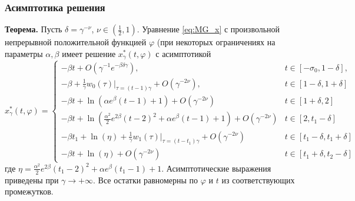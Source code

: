 \begin{frame}
	\frametitle{Асимптотика решения}
	
	\textbf{Теорема.} Пусть $\delta = \gamma^{-\nu}$, $\nu \in (\frac{1}{2}, 1)$. Уравнение \eqref{eq:MG_x} с произвольной непрерывной положительной функцией $\varphi$ (при некоторых ограничениях на параметры $\alpha, \beta$ имеет решение $x_\gamma^*(t, \varphi)$ с асимптотикой
	\footnotesize
	\begin{equation*}
		\label{eq:sol_x*gamma}
		x^*_\gamma(t, \varphi)= 
		\begin{cases}
			- \beta t + O(\gamma^{-1} e^{-\beta \delta \gamma}), & t\in[-\sigma_0, 1 - \delta],\\
			-\beta + \frac{1}{\gamma} w_0(\tau)|_{\tau=(t - 1)\gamma} + O(\gamma^{-2\nu}), & t \in [1 - \delta,1 + \delta]\\
			- \beta t + \ln(\alpha e^{\beta}(t - 1) + 1) + O(\gamma^{-2\nu}) & t\in[1 + \delta, 2]\\
			- \beta t + \ln(\frac{\alpha^2}{2}e^{2 \beta}(t - 2)^2 + \alpha e^{\beta}(t - 1) + 1) + O(\gamma^{-2\nu}) & t \in [2, t_1 - \delta]\\
			- \beta t_1 + \ln(\eta)+\frac{1}{\gamma} w_1(\tau)|_{\tau=(t - t_1)\gamma} + O(\gamma^{-2\nu}) & t\in[t_1 - \delta, t_1  +\delta]\\
			- \beta t + \ln(\eta) + O(\gamma^{-2\nu}) & t \in [t_1 + \delta, t_2 - \delta]
		\end{cases}
	\end{equation*}
	\normalsize
	где $\eta=\frac{\alpha^2}{2}e^{2\beta}(t_1 - 2)^2 + \alpha e^{\beta}(t_1 - 1) + 1$.
	Асимптотические выражения приведены при $\gamma\to+\infty$.
	Все остатки равномерны по $\varphi$ и $t$ из соответствующих промежутков.
\end{frame}

